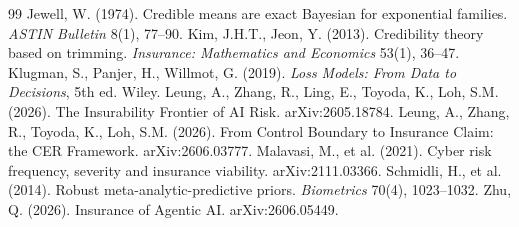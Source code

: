 \documentclass[11pt]{article}
\begin{document}
\begin{thebibliography}{99}
 Jewell, W. (1974). Credible means are exact Bayesian for exponential families. \emph{ASTIN Bulletin} 8(1), 77--90.
 Kim, J.H.T., Jeon, Y. (2013). Credibility theory based on trimming. \emph{Insurance: Mathematics and Economics} 53(1), 36--47.
 Klugman, S., Panjer, H., Willmot, G. (2019). \emph{Loss Models: From Data to Decisions}, 5th ed. Wiley.
 Leung, A., Zhang, R., Ling, E., Toyoda, K., Loh, S.M. (2026). The Insurability Frontier of AI Risk. arXiv:2605.18784.
 Leung, A., Zhang, R., Toyoda, K., Loh, S.M. (2026). From Control Boundary to Insurance Claim: the CER Framework. arXiv:2606.03777.
 Malavasi, M., et al. (2021). Cyber risk frequency, severity and insurance viability. arXiv:2111.03366.
 Schmidli, H., et al. (2014). Robust meta-analytic-predictive priors. \emph{Biometrics} 70(4), 1023--1032.
 Zhu, Q. (2026). Insurance of Agentic AI. arXiv:2606.05449.
\end{thebibliography}
\end{document}
